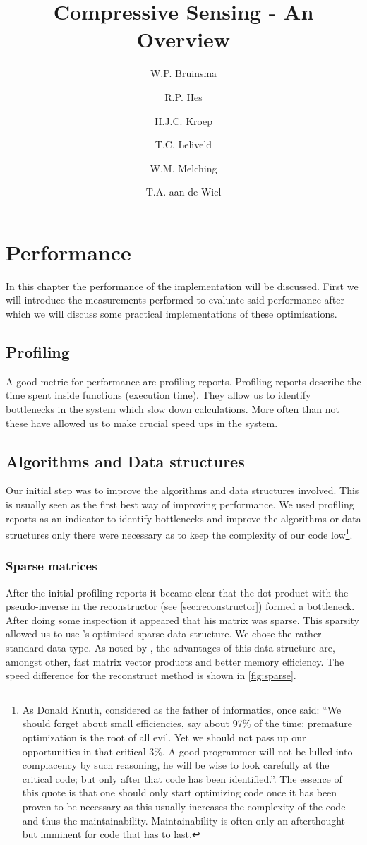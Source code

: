 \documentclass[a4paper, openany, oneside]{memoir}
\title{Compressive Sensing - An Overview}
\author{W.P. Bruinsma \and R.P. Hes \and H.J.C. Kroep \and T.C. Leliveld \and W.M. Melching \and T.A. aan de Wiel}
\begin{document}
\chapter{Performance}
\label{cha:performance}
In this chapter the performance of the implementation will be discussed. First we will introduce the measurements performed to evaluate said performance after which we will discuss some practical implementations of these optimisations.

\section{Profiling}
\label{sec:performance-profiling}
A good metric for performance are profiling reports. Profiling reports describe the time spent inside functions (execution time). They allow us to identify bottlenecks in the system which slow down calculations. More often than not these have allowed us to make crucial speed ups in the system.

\section{Algorithms and Data structures}
Our initial step was to improve the algorithms and data structures involved. This is usually seen as the first best way of improving performance. We used profiling reports as an indicator to identify bottlenecks and improve the algorithms or data structures only there were necessary as to keep the complexity of our code low\footnote{As Donald Knuth, considered as the father of informatics, once said: ``We should forget about small efficiencies, say about 97\% of the time: premature optimization is the root of all evil. Yet we should not pass up our opportunities in that critical 3\%. A good programmer will not be lulled into complacency by such reasoning, he will be wise to look carefully at the critical code; but only after that code has been identified.''\cite{knuth1974structured}. The essence of this quote is that one should only start optimizing code once it has been proven to be necessary as this usually increases the complexity of the code and thus the maintainability. Maintainability is often only an afterthought but imminent for code that has to last.}.

\subsection{Sparse matrices}
\label{sec:sparse-matrices}
After the initial profiling reports it became clear that the dot product with the pseudo-inverse in the reconstructor (see \cref{sec:reconstructor}) formed a bottleneck. After doing some inspection it appeared that his matrix was sparse. This sparsity allowed us to use 's optimised sparse data structure. We chose the rather standard  data type. As noted by \cite{numpyscipy}, the advantages of this data structure are, amongst other, fast matrix vector products and better memory efficiency. The speed difference for the reconstruct method is shown in \cref{fig:sparse}.
\end{document}
